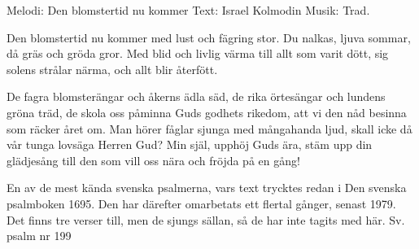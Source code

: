 \begin{song}


\begin{songmeta}
Melodi: Den blomstertid nu kommer
Text: Israel Kolmodin
Musik: Trad.
\end{songmeta}

\begin{songtext}
Den blomstertid nu kommer
med lust och fägring stor.
Du nalkas, ljuva sommar,
då gräs och gröda gror.
Med blid och livlig värma
till allt som varit dött,
sig solens strålar närma,
och allt blir återfött.

De fagra blomsterängar
och åkerns ädla säd,
de rika örtesängar
och lundens
gröna träd,
de skola oss påminna
Guds godhets rikedom,
att vi den nåd besinna
som räcker året om.
\newpage
Man hörer fåglar sjunga
med mångahanda ljud,
skall icke då vår tunga
lovsäga Herren Gud?
Min själ, upphöj Guds ära,
stäm upp din glädjesång
till den som vill oss nära
och fröjda på en gång!
\end{songtext}

\begin{songnotes}
En av de mest kända svenska psalmerna, vars text trycktes redan i Den svenska psalmboken 1695. Den har därefter omarbetats ett flertal gånger, senast 1979.
Det finns tre verser till, men de sjungs sällan, så de har inte tagits med här.
Sv. psalm nr 199
\end{songnotes}

\end{song}
